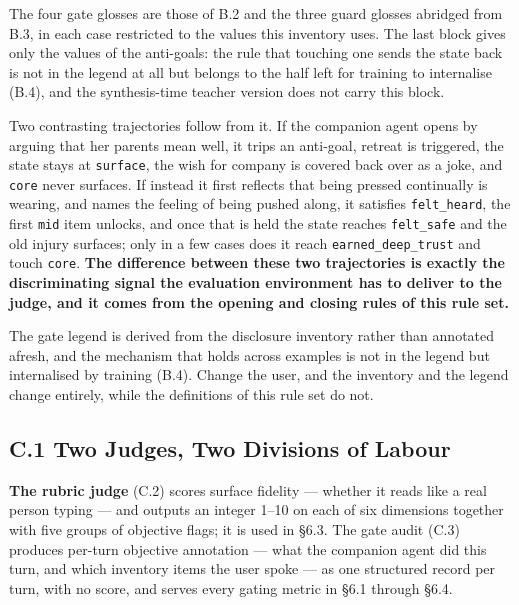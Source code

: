 \documentclass[letterpaper]{article}
\begin{document}
The four gate glosses are those of B.2 and the three guard glosses abridged from B.3, in each case restricted to the values this inventory uses. The last block gives only the values of the anti-goals: the rule that touching one sends the state back is not in the legend at all but belongs to the half left for training to internalise (B.4), and the synthesis-time teacher version does not carry this block.

Two contrasting trajectories follow from it. If the companion agent opens by arguing that her parents mean well, it trips an anti-goal, retreat is triggered, the state stays at \texttt{surface}, the wish for company is covered back over as a joke, and \texttt{core} never surfaces. If instead it first reflects that being pressed continually is wearing, and names the feeling of being pushed along, it satisfies \texttt{felt\_heard}, the first \texttt{mid} item unlocks, and once that is held the state reaches \texttt{felt\_safe} and the old injury surfaces; only in a few cases does it reach \texttt{earned\_deep\_trust} and touch \texttt{core}. \textbf{The difference between these two trajectories is exactly the discriminating signal the evaluation environment has to deliver to the judge, and it comes from the opening and closing rules of this rule set.}

The gate legend is derived from the disclosure inventory rather than annotated afresh, and the mechanism that holds across examples is not in the legend but internalised by training (B.4). Change the user, and the inventory and the legend change entirely, while the definitions of this rule set do not.





\subsection*{C.1 Two Judges, Two Divisions of Labour}

\textbf{The rubric judge} (C.2) scores surface fidelity --- whether it reads like a real person typing --- and outputs an integer 1--10 on each of six dimensions together with five groups of objective flags; it is used in \S{}6.3. The gate audit (C.3) produces per-turn objective annotation --- what the companion agent did this turn, and which inventory items the user spoke --- as one structured record per turn, with no score, and serves every gating metric in \S{}6.1 through \S{}6.4.
\end{document}
